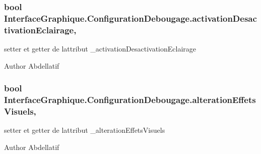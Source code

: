 \subsubsection[{\texorpdfstring{activation\+Desactivation\+Eclairage}{activationDesactivationEclairage}}]{\setlength{\rightskip}{0pt plus 5cm}bool Interface\+Graphique.\+Configuration\+Debougage.\+activation\+Desactivation\+Eclairage\hspace{0.3cm}{\ttfamily [get]}, {\ttfamily [set]}}\hypertarget{class_interface_graphique_1_1_configuration_debougage_ae9abbf86dc968d169b22aa3501211614}{}\label{class_interface_graphique_1_1_configuration_debougage_ae9abbf86dc968d169b22aa3501211614}
setter et getter de l\textquotesingle{}attribut \+\_\+activation\+Desactivation\+Eclairage \begin{DoxyAuthor}{Author}
Abdellatif 
\end{DoxyAuthor}
\subsubsection[{\texorpdfstring{alteration\+Effets\+Visuels}{alterationEffetsVisuels}}]{\setlength{\rightskip}{0pt plus 5cm}bool Interface\+Graphique.\+Configuration\+Debougage.\+alteration\+Effets\+Visuels\hspace{0.3cm}{\ttfamily [get]}, {\ttfamily [set]}}\hypertarget{class_interface_graphique_1_1_configuration_debougage_ada5daa3016fecc8ed3e0c9e1b60cfbbc}{}\label{class_interface_graphique_1_1_configuration_debougage_ada5daa3016fecc8ed3e0c9e1b60cfbbc}
setter et getter de l\textquotesingle{}attribut \+\_\+alteration\+Effets\+Visuels \begin{DoxyAuthor}{Author}
Abdellatif 
\end{DoxyAuthor}
